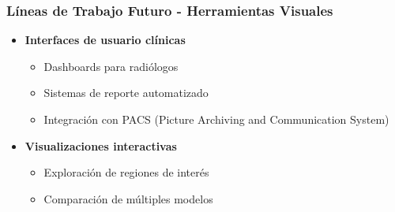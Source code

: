 \begin{frame}
\frametitle{Líneas de Trabajo Futuro - Herramientas Visuales}
\begin{itemize}
    \item \textbf{Interfaces de usuario clínicas}
    \begin{itemize}
        \item Dashboards para radiólogos
        \item Sistemas de reporte automatizado
        \item Integración con PACS (Picture Archiving and Communication System)
    \end{itemize}
    \item \textbf{Visualizaciones interactivas}
    \begin{itemize}
        \item Exploración de regiones de interés
        \item Comparación de múltiples modelos
    \end{itemize}
\end{itemize}
\end{frame}

